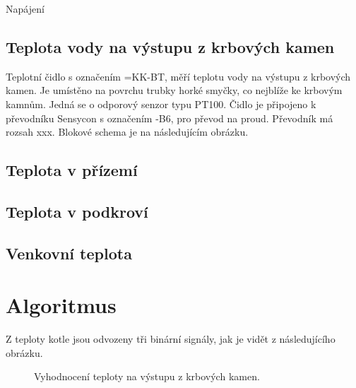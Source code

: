 \documentclass{book}
\begin{document}
    Napájení

    \section{Teplota vody na výstupu z krbových kamen}

        Teplotní čidlo s označením =KK-BT, měří teplotu vody na výstupu
        z krbových kamen. Je umístěno na povrchu trubky horké smyčky,
        co nejblíže ke krbovým kamnům. Jedná se o odporový senzor typu PT100.
        Čidlo je připojeno k převodníku Sensycon\index{} s označením -B6,
        pro převod na proud. Převodník má rozsah xxx. Blokové schema je na následujícím
        obrázku.

        \begin{tikzpicture}[scale=1.0]
        \end{tikzpicture}

    \section{Teplota v přízemí}

    \section{Teplota v podkroví}

    \section{Venkovní teplota}

    \chapter{Algoritmus}

        Z teploty kotle jsou odvozeny tři binární signály, jak je vidět z
        následujícího obrázku.

        \begin{figure}
            \begin{tikzpicture}
                
            \end{tikzpicture}
            \caption{Vyhodnocení teploty na výstupu z krbových kamen.}
        \end{figure}


    \printindex
\end{document}
